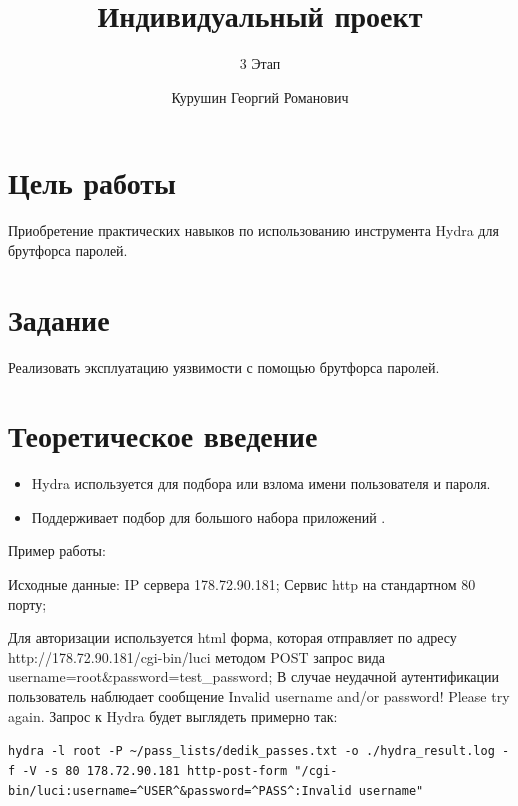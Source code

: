\documentclass[
  english,
  russian,
  12pt,
  a4paper,
  DIV=11,
  numbers=noendperiod]{scrreprt}
\title{Индивидуальный проект}
\subtitle{3 Этап}
\author{Курушин Георгий Романович}
\date{}
\providecommand{\tightlist}{%
  \setlength{\itemsep}{0pt}\setlength{\parskip}{0pt}}
\renewcommand*\contentsname{Содержание}
\newcommand\contentsname{Содержание}
\begin{document}
\maketitle

\renewcommand*\contentsname{Содержание}
{
\setcounter{tocdepth}{1}
\tableofcontents
}
\listoffigures
\listoftables

\chapter{Цель
работы}\label{ux446ux435ux43bux44c-ux440ux430ux431ux43eux442ux44b}

Приобретение практических навыков по использованию инструмента Hydra для
брутфорса паролей.

\chapter{Задание}\label{ux437ux430ux434ux430ux43dux438ux435}

Реализовать эксплуатацию уязвимости с помощью брутфорса паролей.

\chapter{Теоретическое
введение}\label{ux442ux435ux43eux440ux435ux442ux438ux447ux435ux441ux43aux43eux435-ux432ux432ux435ux434ux435ux43dux438ux435}

\begin{itemize}
\tightlist
\item
  Hydra используется для подбора или взлома имени пользователя и пароля.
\item
  Поддерживает подбор для большого набора приложений
  \autocite[\textcite{force}, \textcite{parasram}]{brute}.
\end{itemize}

Пример работы:

Исходные данные: IP сервера 178.72.90.181; Сервис http на стандартном 80
порту;

Для авторизации используется html форма, которая отправляет по адресу
http://178.72.90.181/cgi-bin/luci методом POST запрос вида
username=root\&password=test\_password; В случае неудачной
аутентификации пользователь наблюдает сообщение Invalid username and/or
password! Please try again. Запрос к Hydra будет выглядеть примерно так:

\texttt{hydra\ -l\ root\ -P\ \textasciitilde{}/pass\_lists/dedik\_passes.txt\ -o\ ./hydra\_result.log\ -f\ -V\ -s\ 80\ 178.72.90.181\ http-post-form\ "/cgi-bin/luci:username=\^{}USER\^{}\&password=\^{}PASS\^{}:Invalid\ username"}
\end{document}
